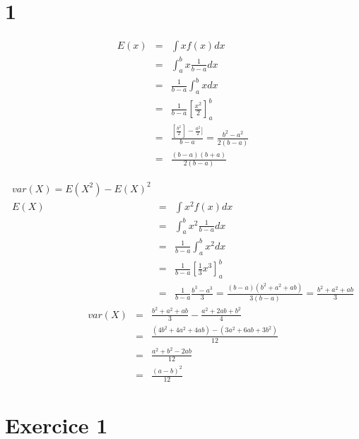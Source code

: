 \documentclass[a4paper, 11pt]{article}
\begin{document}
	\maketitle
	\section{1}
	\begin{eqnarray*}
		E(x) &=& \int xf(x) dx\\
		&=& \int^b_a x\frac{1}{b-a}dx\\
		&=& \frac{1}{b-a}\int^b_a xdx\\
		&=& \frac{1}{b-a} [\frac{x^2}{2}]^b_a\\
		&=& \frac{[\frac{b^2}{2}] - \frac{a^2}{2}]}{b-a} = \frac{b^2 -a^2}{2(b-a)}\\
		&=& \frac{(b-a)(b+a)}{2(b-a)}
	\end{eqnarray*}

	\begin{eqnarray*}
		var(X) = E(X^2)-E(X)^2\\
		E(X) &=& \int x^2f(x)dx\\
		&=& \int^b_a x^2\frac{1}{b-a} dx\\
		&=& \frac{1}{b-a} \int^b_a x^2 dx\\
		&=& \frac{1}{b-a}[\frac{1}{3} x^3]^b_a\\
		&=& \frac{1}{b-a} \frac{b^3-a^3}{3} = \frac{(b-a)(b^2+a^2+ab)}{3(b-a)}=\frac{b^2+a^2+ab}{3}
	\end{eqnarray*}
	\begin{eqnarray*}
		var(X) &=&  \frac{b^2+a^2+ab}{3} - \frac{a^2+2ab+b^2}{4}\\
		&=& \frac{(4b^2 + 4a^2 + 4ab)-(3a^2	+6ab+3b^2)}{12}\\
		&=& \frac{a^2+b^2-2ab}{12}\\
		&=&\frac{(a-b)^2}{12}
	\end{eqnarray*}
	\section{Exercice 1}
\end{document}
